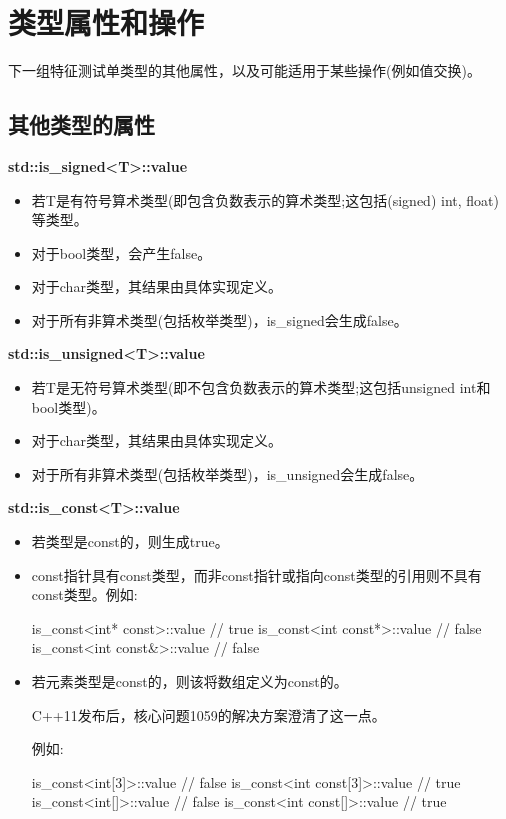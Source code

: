 \section{类型属性和操作}

下一组特征测试单类型的其他属性，以及可能适用于某些操作(例如值交换)。

\subsection{其他类型的属性}

\textbf{std::is\_signed<T>::value}

\begin{itemize}
\item 
若T是有符号算术类型(即包含负数表示的算术类型;这包括(signed) int, float)等类型。

\item 
对于bool类型，会产生false。

\item 
对于char类型，其结果由具体实现定义。

\item 
对于所有非算术类型(包括枚举类型)，is\_signed会生成false。
\end{itemize}

\textbf{std::is\_unsigned<T>::value}

\begin{itemize}
\item 
若T是无符号算术类型(即不包含负数表示的算术类型;这包括unsigned int和bool类型)。

\item 
对于char类型，其结果由具体实现定义。

\item 
对于所有非算术类型(包括枚举类型)，is\_unsigned会生成false。
\end{itemize}

\textbf{std::is\_const<T>::value}

\begin{itemize}
\item 
若类型是const的，则生成true。

\item 
const指针具有const类型，而非const指针或指向const类型的引用则不具有const类型。例如:
\begin{cpp}
is_const<int* const>::value // true
is_const<int const*>::value // false
is_const<int const&>::value // false
\end{cpp}

\item 
若元素类型是const的，则该将数组定义为const的。

\begin{notice}
C++11发布后，核心问题1059的解决方案澄清了这一点。
\end{notice}

例如:
\begin{cpp}
is_const<int[3]>::value // false
is_const<int const[3]>::value // true
is_const<int[]>::value // false
is_const<int const[]>::value // true
\end{cpp}

\end{itemize}

